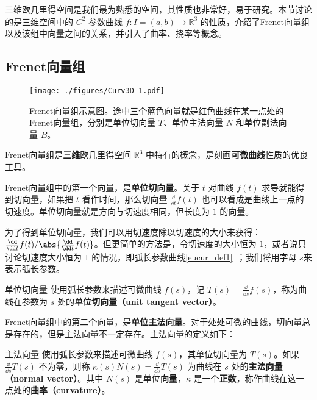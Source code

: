 

三维欧几里得空间是我们最为熟悉的空间，其性质也非常好，易于研究。本节讨论的是三维空间中的 $C^2$ 参数曲线 $f: I = (a, b) \to \mathbb{R}^3$ 的性质，介绍了Frenet向量组以及该组中向量之间的关系，并引入了曲率、挠率等概念。


\subsection{Frenet向量组}

\begin{figure}[ht]
\centering
\texttt{[image: ./figures/Curv3D\_1.pdf]}
\caption{Frenet向量组示意图。途中三个蓝色向量就是红色曲线在某一点处的Frenet向量组，分别是单位切向量 $T$、单位主法向量 $N$ 和单位副法向量 $B$。} \label{Curv3D_fig1}
\end{figure}

Frenet向量组是\textbf{三维}欧几里得空间 $\mathbb{R}^3$ 中特有的概念，是刻画\textbf{可微曲线}性质的优良工具。

Frenet向量组中的第一个向量，是\textbf{单位切向量}。关于 $t$ 对曲线 $f(t)$ 求导就能得到切向量，如果把 $t$ 看作时间，那么切向量 $\frac{\dd}{\dd t}f(t)$ 也可以看成是曲线上一点的切速度。单位切向量就是方向与切速度相同，但长度为 $1$ 的向量。

为了得到单位切向量，我们可以用切速度除以切速度的大小来获得：$\frac{\dd}{\dd t}f(t)/\abs{\frac{\dd}{\dd t}f(t)}$。但更简单的方法是，令切速度的大小恒为 $1$，或者说只讨论切速度大小恒为 $1$ 的情况，即弧长参数曲线\autoref{eucur_def1}~；我们将用字母 $s$来表示弧长参数。

\begin{definition}{单位切向量}\label{Curv3D_def1}
使用弧长参数来描述可微曲线 $f(s)$，记 $T(s)=\frac{\dd}{\dd s}f(s)$，称为曲线在参数为 $s$ 处的\textbf{单位切向量（unit tangent vector）}。
\end{definition}

Frenet向量组中的第二个向量，是\textbf{单位主法向量}。对于处处可微的曲线，切向量总是存在的，但是主法向量不一定存在。主法向量的定义如下：

\begin{definition}{主法向量}\label{Curv3D_def2}
使用弧长参数来描述可微曲线 $f(s)$，其单位切向量为 $T(s)$。如果 $\frac{\dd}{\dd s}T(s)$ 不为零，则称 $\kappa(s) N(s)=\frac{\dd}{\dd s}T(s)$ 为曲线在 $s$ 处的\textbf{主法向量（normal vector）}。其中 $N(s)$ 是单位\textbf{向量}，$\kappa$ 是一个\textbf{正数}，称作曲线在这一点处的\textbf{曲率（curvature）}。
\end{definition}

